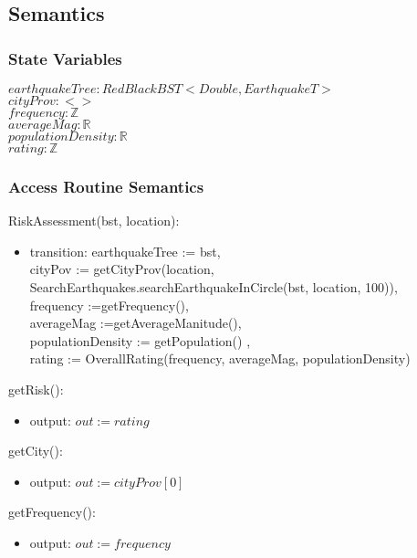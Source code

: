 \documentclass[12pt]{article}
\begin{document}
\subsection* {Semantics}

\subsubsection* {State Variables}

$\mathit{earthquakeTree} : RedBlackBST<Double, EarthquakeT>$ \\
$\mathit{cityProv} : <>$ \\
$\mathit{frequency} : \mathbb{Z}$ \\
$\mathit{averageMag} : \mathbb{R}$ \\
$\mathit{populationDensity} : \mathbb{R}$ \\
$\mathit{rating} : \mathbb{Z}$ \\


\subsubsection* {Access Routine Semantics}

\noindent RiskAssessment(bst, location):
\begin{itemize}
\item transition: earthquakeTree := bst,\\
 cityPov := getCityProv(location, SearchEarthquakes.searchEarthquakeInCircle(bst, location, 100)),\\
 frequency :=getFrequency(), \\
 averageMag :=getAverageManitude(), \\
 populationDensity :=    getPopulation() ,\\ 
 rating := OverallRating(frequency, averageMag, populationDensity) \\
\end{itemize}

\noindent getRisk():
\begin{itemize}
\item output: $\mathit{out} := rating$
\end{itemize}


\noindent getCity():
\begin{itemize}
\item output: $\mathit{out} := cityProv[0]$ 
\end{itemize}

\noindent getFrequency():
\begin{itemize}
\item output: $\mathit{out} := frequency$ 
\end{itemize}
\end{document}
